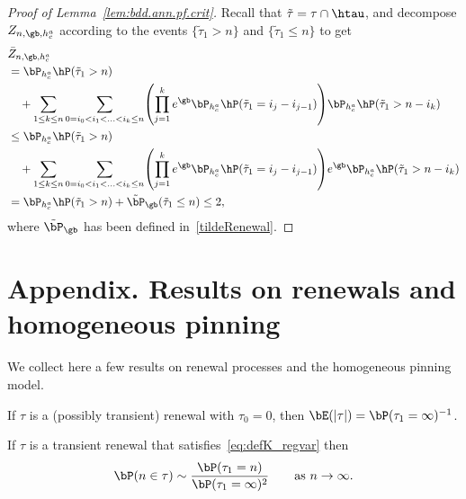 \begin{proof}[Proof of Lemma~\ref{lem:bdd.ann.pf.crit}]
Recall that $\tilde\tau = \tau \cap \htau$, and decompose $Z_{n,\gb,h_c^a}$ according to the events $\{\tilde\tau_1 > n\}$ and $\{\tilde\tau_1 \leq n\}$ to get
\begin{align}
&\bar Z_{n,\gb,h_c^a} \\
&= \bP_{h_c^a}\hP (\tilde\tau_1 > n)\nonumber\\
&\quad + \sum_{1\leq k\leq n} \sum_{0=i_0<i_1<\ldots<i_k\leq n} \!\left(\prod_{j=1}^k e^\gb \bP_{h_c^a} \hP (\tilde\tau_1 = i_j - i_{j-1}) \right)\! \bP_{h_c^a} \hP (\tilde\tau_1 > n-i_k)\nonumber\\
&\leq \bP_{h_c^a} \hP (\tilde\tau_1 > n)\nonumber\\
&\quad + \sum_{1\leq k\leq n} \sum_{0=i_0<i_1<\ldots<i_k\leq n} \!\left(\prod_{j=1}^k e^\gb \bP_{h_c^a} \hP (\tilde\tau_1 = i_j - i_{j-1}) \right)\! e^{\gb} \bP_{h_c^a} \hP (\tilde\tau_1 > n-i_k)\nonumber\\
&= \bP_{h_c^a} \hP (\tilde\tau_1 > n) + \tilde\bP_{\gb}(\tilde\tau_1 \leq n) \leq 2,\nonumber
\end{align}
where $\tilde\bP_{\gb}$ has been defined in~\eqref{tildeRenewal}.
\end{proof}

\appendix

\section*{Appendix. Results on renewals and homogeneous pinning} \label{Facts}
\setcounter{section}{1}
\setcounter{equation}{0}
\setcounter{cdrthm}{0}

We collect here a few results on renewal processes and the homogeneous pinning model.

\begin{prop} \label{meanReturns}
If $\tau$ is a (possibly transient) renewal with $\tau_0 = 0$, then $\bE(|\tau|) = \bP(\tau_1 = \infty)^{-1}$.
\end{prop}

\begin{prop}
If $\tau$ is a transient renewal that satisfies~\eqref{eq:defK_regvar} then
\begin{equation}
\bP(n \in \tau) \sim \frac{\bP(\tau_1 = n)}{\bP(\tau_1 = \infty)^2} \qquad \text{as } n \to \infty.
\end{equation}
\end{prop}

